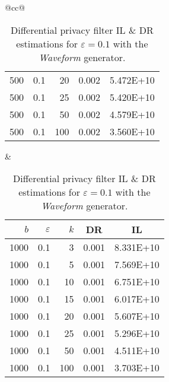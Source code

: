 \begin{table}[H]
\begin{tabular}{@{}cc@{}}
\begin{tabular}{@{}rrrrr@{}}
			500	&	0.1	&	20	&	0.002	&	5.472E+10 \\
			500	&	0.1	&	25	&	0.002	&	5.420E+10 \\
			500	&	0.1	&	50	&	0.002	&	4.579E+10 \\
			500	&	0.1	&	100	&	0.002	&	3.560E+10 \\
		\end{tabular}
		&
		\begin{tabular}{@{}rrrrr@{}}
			\toprule
			$b$ & $\varepsilon$ & $k$ & \multicolumn{1}{c}{DR} & \multicolumn{1}{c}{IL} \\ \midrule
			1000	&	0.1	&	3	&	0.001	&	8.331E+10 \\
			1000	&	0.1	&	5	&	0.001	&	7.569E+10 \\
			1000	&	0.1	&	10	&	0.001	&	6.751E+10 \\
			1000	&	0.1	&	15	&	0.001	&	6.017E+10 \\
			1000	&	0.1	&	20	&	0.001	&	5.607E+10 \\
			1000	&	0.1	&	25	&	0.001	&	5.296E+10 \\
			1000	&	0.1	&	50	&	0.001	&	4.511E+10 \\
			1000	&	0.1	&	100	&	0.001	&	3.703E+10 \\
		\end{tabular}
	\end{tabular}
	\caption[Differential privacy filter DR \& IL estimations (Waveform), $\varepsilon = 0.1$.]{Differential privacy filter IL \& DR estimations for $\varepsilon = 0.1$ with the \textit{Waveform} generator.}
\end{table}

